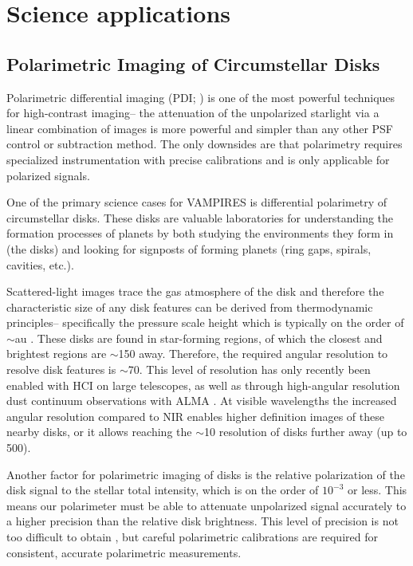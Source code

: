\section{Science applications}\label{sec:science}

\subsection{Polarimetric Imaging of Circumstellar Disks}

Polarimetric differential imaging (PDI; \citealt{kuhn_imaging_2001}) is one of the most powerful techniques for high-contrast imaging-- the attenuation of the unpolarized starlight via a linear combination of images is more powerful and simpler than any other PSF control or subtraction method. The only downsides are that polarimetry requires specialized instrumentation with precise calibrations and is only applicable for polarized signals.

One of the primary science cases for VAMPIRES is differential polarimetry of circumstellar disks. These disks are valuable laboratories for understanding the formation processes of planets by both studying the environments they form in (the disks) and looking for signposts of forming planets (ring gaps, spirals, cavities, etc.).

Scattered-light images trace the gas atmosphere of the disk and therefore the characteristic size of any disk features can be derived from thermodynamic principles-- specifically the pressure scale height which is typically on the order of $\sim$\si{au} \citep{andrews_structures_2021}. These disks are found in star-forming regions, of which the closest and brightest regions are $\sim$\SI{150}{\parsec} away. Therefore, the required angular resolution to resolve disk features is $\sim$\SI{70}{\mas}. This level of resolution has only recently been enabled with HCI on large telescopes, as well as through high-angular resolution dust continuum observations with ALMA \citep{andrews_disk_2018}. At visible wavelengths the increased angular resolution compared to NIR enables higher definition images of these nearby disks, or it allows reaching the $\sim$\SI{10}{\au} resolution of disks further away (up to \SI{500}{\parsec}).

Another factor for polarimetric imaging of disks is the relative polarization of the disk signal to the stellar total intensity, which is on the order of $10^{-3}$ or less. This means our polarimeter must be able to attenuate unpolarized signal accurately to a higher precision than the relative disk brightness. This level of precision is not too difficult to obtain \citep{schmid_spherezimpol_2018,holstein_polarimetric_2020,holstein_calibration_2020}, but careful polarimetric calibrations are required for consistent, accurate polarimetric measurements.

